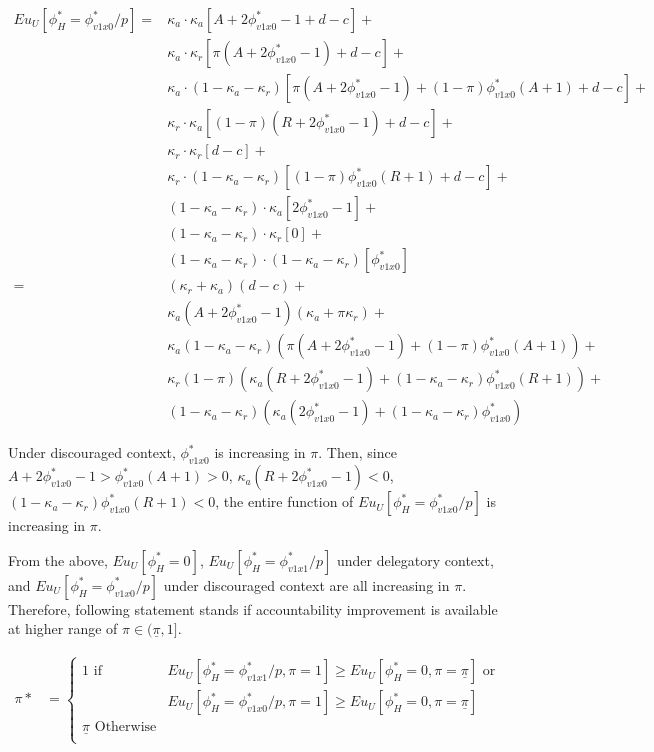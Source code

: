 \begin{align*}
	Eu_U[\phi^*_H = \phi^*_{v1x0}/p] =& \kappa_a \cdot \kappa_a [ A + 2\phi^*_{v1x0} - 1 + d - c] + \\
	&\kappa_a \cdot \kappa_r [ \pi(A+2\phi^*_{v1x0}-1) + d - c] + \\
	&\kappa_a \cdot (1-\kappa_a-\kappa_r) [ \pi(A+2\phi^*_{v1x0}-1) + (1-\pi)\phi^*_{v1x0}(A+1) + d - c] + \\
	&\kappa_r \cdot \kappa_a [ (1-\pi)(R+2\phi^*_{v1x0}-1) + d - c] + \\
	&\kappa_r \cdot \kappa_r [ d - c ] + \\
	&\kappa_r \cdot (1-\kappa_a-\kappa_r) [ (1-\pi)\phi^*_{v1x0}(R+1) + d - c] + \\
	&(1-\kappa_a-\kappa_r) \cdot \kappa_a [ 2\phi^*_{v1x0}-1 ] + \\
	&(1-\kappa_a-\kappa_r) \cdot \kappa_r [ 0 ] + \\
	&(1-\kappa_a-\kappa_r) \cdot (1-\kappa_a-\kappa_r) [ \phi^*_{v1x0} ] \\
	=& (\kappa_r+\kappa_a)(d-c) + \\
	&\kappa_a(A+2\phi^*_{v1x0}-1)(\kappa_a+\pi\kappa_r) + \\
	&\kappa_a(1-\kappa_a-\kappa_r)(\pi(A+2\phi^*_{v1x0}-1) + (1-\pi)\phi^*_{v1x0}(A+1)) + \\
	&\kappa_r(1-\pi)(\kappa_a(R+2\phi^*_{v1x0}-1)+(1-\kappa_a-\kappa_r)\phi^*_{v1x0}(R+1)) + \\
	&(1-\kappa_a-\kappa_r)(\kappa_a(2\phi^*_{v1x0}-1)+(1-\kappa_a-\kappa_r)\phi^*_{v1x0}) 
\end{align*}

\noindent Under discouraged context, $\phi^*_{v1x0}$ is increasing in $\pi$. Then, since $A+2\phi^*_{v1x0}-1>\phi^*_{v1x0}(A+1)>0$, $\kappa_a(R+2\phi^*_{v1x0}-1)<0$, $(1-\kappa_a-\kappa_r)\phi^*_{v1x0}(R+1)<0$, the entire function of $Eu_U[\phi^*_H = \phi^*_{v1x0}/p]$ is increasing in $\pi$. 

\par From the above, $Eu_U[\phi^*_H=0]$, $Eu_U[\phi^*_H = \phi^*_{v1x1}/p]$ under delegatory context, and $Eu_U[\phi^*_H = \phi^*_{v1x0}/p]$ under discouraged context are all increasing in $\pi$. Therefore, following statement stands if accountability improvement is available at higher range of $\pi \in (\underline{\pi},1]$.

\begin{align*}
	\pi* &= 
	\begin{cases}
		1 \text{ if } &Eu_U[\phi^*_H = \phi^*_{v1x1}/p, \pi=1] \geq Eu_U[\phi^*_H=0,\pi=\underline{\pi}] \text{ or }\\
		&Eu_U[\phi^*_H = \phi^*_{v1x0}/p, \pi=1] \geq Eu_U[\phi^*_H=0,\pi=\underline{\pi}]\\
		\underline{\pi} \text{ Otherwise} &\text{ }\\
	\end{cases}
\end{align*}

